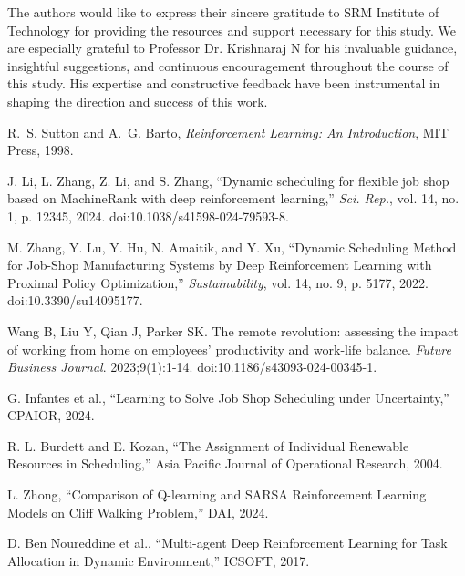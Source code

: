 \documentclass[%
aip,
cp,  %
amsmath,amssymb,
reprint,%
]{revtex4-2}
\begin{document}
	\begin{acknowledgments}
		The authors would like to express their sincere gratitude to SRM Institute of
		Technology for providing the resources and support necessary for this study. We
		are especially grateful to Professor Dr. Krishnaraj N for his invaluable
		guidance, insightful suggestions, and continuous encouragement throughout the
		course of this study. His expertise and constructive feedback have been instrumental
		in shaping the direction and success of this work.
	\end{acknowledgments}
	
	
	\nocite{*}
	
	\begin{thebibliography}{99}

		
		R.~S. Sutton and A.~G. Barto, \emph{Reinforcement Learning: An Introduction}, MIT Press, 1998.
		
		J. Li, L. Zhang, Z. Li, and S. Zhang, ``Dynamic scheduling for flexible job shop based on MachineRank with deep reinforcement learning,'' \textit{Sci. Rep.}, vol. 14, no. 1, p. 12345, 2024. doi:10.1038/s41598-024-79593-8.
		
		M. Zhang, Y. Lu, Y. Hu, N. Amaitik, and Y. Xu, ``Dynamic Scheduling Method for Job-Shop Manufacturing Systems by Deep Reinforcement Learning with Proximal Policy Optimization,'' \textit{Sustainability}, vol. 14, no. 9, p. 5177, 2022. doi:10.3390/su14095177.
		
		
		
		Wang B, Liu Y, Qian J, Parker SK. The remote revolution: assessing the impact of working from home on employees' productivity and work-life balance. \textit{Future Business Journal}. 2023;9(1):1-14. doi:10.1186/s43093-024-00345-1.
		
		 G. Infantes et al., ``Learning to Solve Job Shop Scheduling
		under Uncertainty,'' CPAIOR, 2024.
		
		 R. L. Burdett and E. Kozan, ``The Assignment of
		Individual Renewable Resources in Scheduling,'' Asia Pacific Journal of
		Operational Research, 2004.
		
		 L. Zhong, ``Comparison of Q-learning and SARSA
		Reinforcement Learning Models on Cliff Walking Problem,'' DAI, 2024.
		
		 D. Ben Noureddine et al., ``Multi-agent Deep Reinforcement
		Learning for Task Allocation in Dynamic Environment,'' ICSOFT, 2017.
		

\end{thebibliography}
\end{document}
